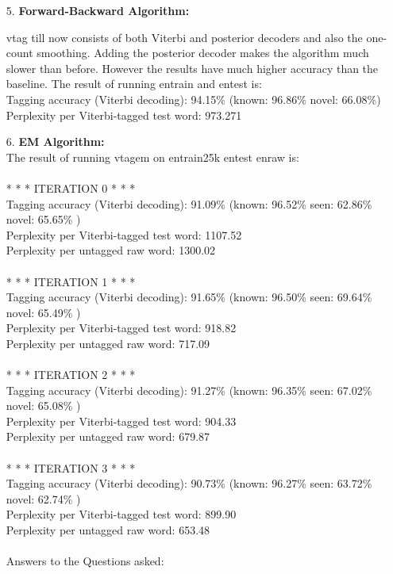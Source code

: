 \documentclass{article}
\begin{document}
\begin{enumerate}
\item[5.]
\textbf{Forward-Backward Algorithm:}

vtag till now consists of both Viterbi and posterior decoders and also the one-count smoothing. Adding the posterior decoder makes the algorithm much slower than before. However the results have much higher accuracy than the baseline. 
The result of running entrain and entest is: 
\\Tagging accuracy (Viterbi decoding): 94.15\%     (known: 96.86\%  novel: 66.08\%)
\\Perplexity per Viterbi-tagged test word: 973.271

\item[6.]
\textbf{EM Algorithm:}
\\The result of running vtagem on entrain25k entest enraw is:
\\\\* * * ITERATION 0 * * *
\\Tagging accuracy (Viterbi decoding): 91.09\%       (known: 96.52\%   seen: 62.86\%     novel: 65.65\% )
\\Perplexity per Viterbi-tagged test word: 1107.52
\\Perplexity per untagged raw word: 1300.02
\\
\\* * * ITERATION 1 * * *
\\Tagging accuracy (Viterbi decoding): 91.65\%       (known: 96.50\%   seen: 69.64\%     novel: 65.49\% )
\\Perplexity per Viterbi-tagged test word: 918.82
\\Perplexity per untagged raw word: 717.09
\\
\\* * * ITERATION 2 * * *
\\Tagging accuracy (Viterbi decoding): 91.27\%       (known: 96.35\%   seen: 67.02\%     novel: 65.08\% )
\\Perplexity per Viterbi-tagged test word: 904.33
\\Perplexity per untagged raw word: 679.87
\\
\\* * * ITERATION 3 * * *
\\Tagging accuracy (Viterbi decoding): 90.73\%       (known: 96.27\%   seen: 63.72\%     novel: 62.74\% )
\\Perplexity per Viterbi-tagged test word: 899.90
\\Perplexity per untagged raw word: 653.48
\\
\\Answers to the Questions asked:

\end{enumerate}
\end{document}
